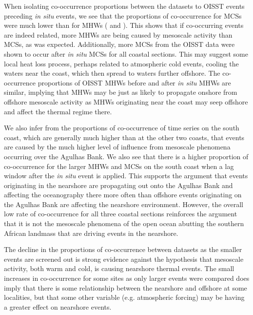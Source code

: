\documentclass[a4paper,10pt,review]{elsarticle}
\begin{document}
When isolating co-occurrence proportions between the datasets to OISST events preceding \emph{in situ} events, we see that the proportions of co-occurrence for MCSs were much lower than for MHWs ( and ). This shows that if co-occurring events are indeed related, more MHWs are being caused by mesoscale activity than MCSs, as was expected. Additionally, more MCSs from the OISST data were shown to occur after \emph{in situ} MCSs for all coastal sections. This may suggest some local heat loss process, perhaps related to atmospheric cold events, cooling the waters near the coast, which then spread to waters further offshore. The co-occurrence proportions of OISST MHWs before and after \emph{in situ} MHWs are similar, implying that MHWs may be just as likely to propagate onshore from offshore mesoscale activity as MHWs originating near the coast may seep offshore and affect the thermal regime there.

We also infer from the proportions of co-occurrence of time series on the south coast, which are generally much higher than at the other two coasts, that events are caused by the much higher level of influence from mesoscale phenomena occurring over the Agulhas Bank. We also see that there is a higher proportion of co-occurrence for the larger MHWs and MCSs on the south coast when a lag window after the \emph{in situ} event is applied. This supports the argument that events originating in the nearshore are propagating out onto the Agulhas Bank and affecting the oceanography there more often than offshore events originating on the Agulhas Bank are affecting the nearshore environment. However, the overall low rate of co-occurrence for all three coastal sections reinforces the argument that it is not the mesoscale phenomena of the open ocean abutting the southern African landmass that are driving events in the nearshore.

The decline in the proportions of co-occurrence between datasets as the smaller events are screened out is strong evidence against the hypothesis that mesoscale activity, both warm and cold, is causing nearshore thermal events. The small increases in co-occurrence for some sites as only larger events were compared does imply that there is some relationship between the nearshore and offshore at some localities, but that some other variable (e.g. atmospheric forcing) may be having a greater effect on nearshore events.
\end{document}
